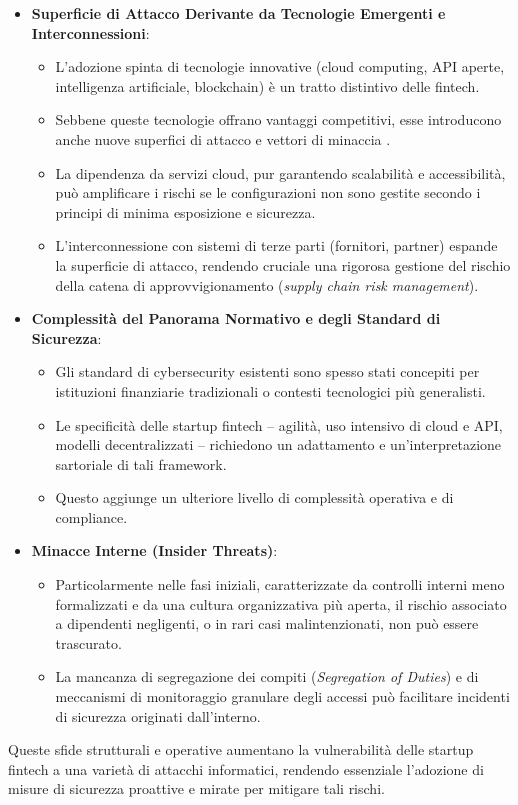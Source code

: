 \begin{itemize}
    \item \textbf{Superficie di Attacco Derivante da Tecnologie Emergenti e Interconnessioni}:
    \begin{itemize}
        \item L'adozione spinta di tecnologie innovative
        (cloud computing, API aperte, intelligenza artificiale, blockchain)\allowbreak{} %
        è un tratto distintivo delle fintech.

        \item Sebbene queste tecnologie offrano vantaggi competitivi, esse introducono anche nuove superfici di attacco e vettori di minaccia \cite{fintechChallenges}.
        \item La dipendenza da servizi cloud, pur garantendo scalabilità e accessibilità, può amplificare i rischi se le configurazioni non sono gestite secondo i principi di minima esposizione e sicurezza.
        \item L'interconnessione con sistemi di terze parti (fornitori, partner) espande la superficie di attacco, rendendo cruciale una rigorosa gestione del rischio della catena di approvvigionamento (\textit{supply chain risk management}).
    \end{itemize}
    
    \item \textbf{Complessità del Panorama Normativo e degli Standard di Sicurezza}:
    \begin{itemize}
        \item Gli standard di cybersecurity esistenti sono spesso stati concepiti per istituzioni finanziarie tradizionali o contesti tecnologici più generalisti.
        \item Le specificità delle startup fintech – agilità, uso intensivo di cloud e API, modelli decentralizzati – richiedono un adattamento e un'interpretazione sartoriale di tali framework.
        \item Questo aggiunge un ulteriore livello di complessità operativa e di compliance.
    \end{itemize}
    
    \item \textbf{Minacce Interne (Insider Threats)}:
    \begin{itemize}
        \item Particolarmente nelle fasi iniziali, caratterizzate da controlli interni meno formalizzati e da una cultura organizzativa più aperta, il rischio associato a dipendenti negligenti, o in rari casi malintenzionati, non può essere trascurato.
        \item La mancanza di segregazione dei compiti (\textit{Segregation of Duties}) e di meccanismi di monitoraggio granulare degli accessi può facilitare incidenti di sicurezza originati dall'interno.
    \end{itemize}
\end{itemize}
Queste sfide strutturali e operative aumentano la vulnerabilità delle startup fintech a una varietà di attacchi informatici, rendendo essenziale l'adozione di misure di sicurezza proattive e mirate per mitigare tali rischi.

